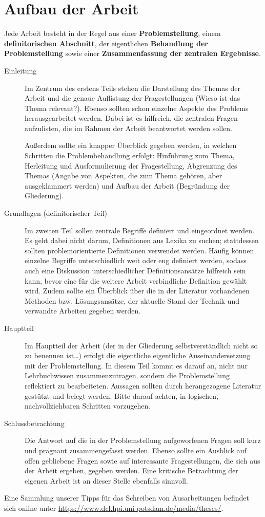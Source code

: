 \chapter{Aufbau der Arbeit}

Jede Arbeit besteht in der Regel aus einer \textbf{Problemstellung}, einem \textbf{definitorischen Abschnitt}, der eigentlichen \textbf{Behandlung der Problemstellung} sowie einer \textbf{Zusammenfassung der zentralen Ergebnisse}.

\begin{description}

	\item[Einleitung] Im Zentrum des erstens Teils stehen die Darstellung des Themas der Arbeit und die genaue Auflistung der Fragestellungen (Wieso ist das Thema relevant?). Ebenso sollten schon einzelne Aspekte des Problems herausgearbeitet werden. Dabei ist es hilfreich, die zentralen Fragen aufzulisten, die im Rahmen der Arbeit beantwortet werden sollen.

	Außerdem sollte ein knapper Überblick gegeben werden, in welchen Schritten die Problembehandlung erfolgt: Hinführung zum Thema, Herleitung und Ausformulierung der Fragestellung, Abgrenzung des Themas (Angabe von Aspekten, die zum Thema gehören, aber ausgeklammert werden) und Aufbau der Arbeit (Begründung der Gliederung).

	\item[Grundlagen (definitorischer Teil)] Im zweiten Teil sollen zentrale Begriffe definiert und eingeordnet werden. Es geht dabei nicht darum, Definitionen aus Lexika zu suchen; stattdessen sollten problemorientierte Definitionen verwendet werden. Häufig können einzelne Begriffe unterschiedlich weit oder eng definiert werden, sodass auch eine Diskussion unterschiedlicher Definitionsansätze hilfreich sein kann, bevor eine für die weitere Arbeit verbindliche Definition gewählt wird. Zudem sollte ein Überblick über die in der Literatur vorhandenen Methoden bzw. Lösungsansätze, der aktuelle Stand der Technik und verwandte Arbeiten gegeben werden.

	\item[Hauptteil] Im Hauptteil der Arbeit (der in der Gliederung selbstverständlich nicht so zu benennen ist\ldots) erfolgt die eigentliche eigentliche Auseinandersetzung mit der Problemstellung. In diesem Teil kommt es darauf an, nicht nur Lehrbuchwissen zusammenzutragen, sondern die Problemstellung reflektiert zu bearbeiteten. Aussagen sollten durch herangezogene Literatur gestützt und belegt werden. Bitte darauf achten, in logischen, nachvollziehbaren Schritten vorzugehen.

	\item[Schlussbetrachtung] Die Antwort auf die in der Problemstellung aufgeworfenen Fragen soll kurz und prägnant zusammengefasst werden. Ebenso sollte ein Ausblick auf offen gebliebene Fragen sowie auf interessante Fragestellungen, die sich aus der Arbeit ergeben, gegeben werden. Eine kritische Betrachtung der eigenen Arbeit ist an dieser Stelle ebenfalls sinnvoll.

\end{description}

\noindent
Eine Sammlung unserer Tipps für das Schreiben von Ausarbeitungen befindet sich online unter \url{https://www.dcl.hpi.uni-potsdam.de/media/theses/}.
